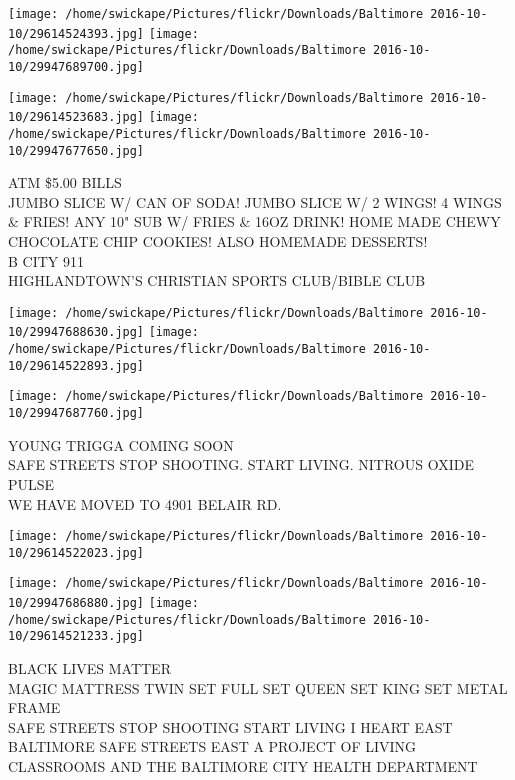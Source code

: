 \documentclass[10pt,letterpaper]{article}
\begin{document}
\texttt{[image: /home/swickape/Pictures/flickr/Downloads/Baltimore 2016-10-10/29614524393.jpg]}
\texttt{[image: /home/swickape/Pictures/flickr/Downloads/Baltimore 2016-10-10/29947689700.jpg]}

\texttt{[image: /home/swickape/Pictures/flickr/Downloads/Baltimore 2016-10-10/29614523683.jpg]}
\texttt{[image: /home/swickape/Pictures/flickr/Downloads/Baltimore 2016-10-10/29947677650.jpg]}

ATM \$5.00 BILLS\\
JUMBO SLICE W/ CAN OF SODA! JUMBO SLICE W/ 2 WINGS!    4 WINGS \& FRIES!  ANY 10" SUB W/ FRIES \& 16OZ DRINK!  HOME MADE CHEWY CHOCOLATE CHIP COOKIES!  ALSO HOMEMADE DESSERTS!\\
B CITY 911\\
HIGHLANDTOWN'S CHRISTIAN SPORTS CLUB/BIBLE CLUB\\
\pagebreak

\texttt{[image: /home/swickape/Pictures/flickr/Downloads/Baltimore 2016-10-10/29947688630.jpg]}
\texttt{[image: /home/swickape/Pictures/flickr/Downloads/Baltimore 2016-10-10/29614522893.jpg]}

\texttt{[image: /home/swickape/Pictures/flickr/Downloads/Baltimore 2016-10-10/29947687760.jpg]}

YOUNG TRIGGA COMING SOON\\
SAFE STREETS STOP SHOOTING. START LIVING.  NITROUS OXIDE PULSE\\
WE HAVE MOVED TO 4901 BELAIR RD.\\
\pagebreak

\texttt{[image: /home/swickape/Pictures/flickr/Downloads/Baltimore 2016-10-10/29614522023.jpg]}

\vspace{0.25in}
\texttt{[image: /home/swickape/Pictures/flickr/Downloads/Baltimore 2016-10-10/29947686880.jpg]}
\texttt{[image: /home/swickape/Pictures/flickr/Downloads/Baltimore 2016-10-10/29614521233.jpg]}

BLACK LIVES MATTER\\
MAGIC MATTRESS TWIN SET FULL SET QUEEN SET KING SET METAL FRAME\\
SAFE STREETS STOP SHOOTING START LIVING I HEART EAST BALTIMORE SAFE STREETS EAST A PROJECT OF LIVING CLASSROOMS AND THE BALTIMORE CITY HEALTH DEPARTMENT\\
\pagebreak
\end{document}
